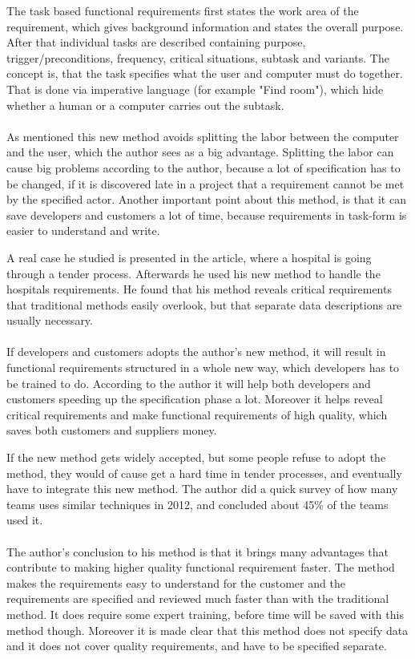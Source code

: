 \documentclass[Main]{subfiles}
\begin{document}
The task based functional requirements first states the work area of the requirement, which gives background information and states the overall purpose. 
After that individual tasks are described containing purpose, trigger/preconditions, frequency, critical situations, subtask and variants. 
The concept is, that the task specifies what the user and computer must do together. That is done via imperative language (for example "Find room"), which hide whether a human or a computer carries out the subtask.  
\\
\\
As mentioned this new method avoids splitting the labor between the computer and the user, which the author sees as a big advantage. 
Splitting the labor can cause big problems according to the author, because a lot of spe\-cification has to be changed, if it is discovered late in a project that a requirement cannot be met by the specified actor.
Another important point about this method, is that it can save developers and customers a lot of time, because requirements in task-form is easier to understand and write.

A real case he studied is presented in the article, where a hospital is going through a tender process. 
Afterwards he used his new method to handle the hospitals requirements. 
He found that his method reveals critical requirements that traditional methods easily overlook, but that separate data descriptions are usually necessary.
\\
\\
If developers and customers adopts the author's new method, it will result in functional requirements structured in a whole new way, which developers has to be trained to do.
According to the author it will help both developers and customers speeding up the specification phase a lot. 
Moreover it helps reveal critical requirements and make functional requirements of high quality, which saves both customers and suppliers money.

If the new method gets widely accepted, but some people refuse to adopt the method, they would of cause get a hard time in tender processes, and eventually have to integrate this new method.
The author did a quick survey of how many teams uses similar techniques in 2012\cite{Task2}, and concluded about 45\% of the teams used it.
\\
\\
The author's conclusion to his method is that it brings many advantages that contribute to making higher quality functional requirement faster. 
The method makes the requirements easy to understand for the customer and the requirements are specified and reviewed much faster than with the traditional method.
It does require some expert training, before time will be saved with this method though. 
Moreover it is made clear that this method does not specify data and it does not cover quality requirements, and have to be specified separate.
\end{document}
